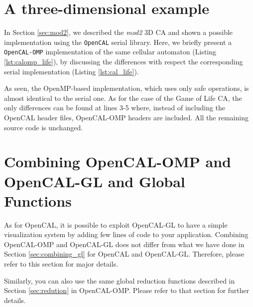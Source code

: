 \section{A three-dimensional example}
In Section \ref{sec:mod2}, we described the \emph{mod2} 3D CA and
shown a possible implementation using the \verb'OpenCAL' serial
library. Here, we briefly present a \verb'OpenCAL-OMP' implementation
of the same cellular automaton (Listing \ref{lst:calomp_life}), by
discussing the differences with respect the corresponding serial
implementation (Listing \ref{lst:cal_life}).



As seen, the OpenMP-based implementation, which uses only safe
operations, is almost identical to the serial one. As for the case of
the Game of Life CA, the only differences can be found at lines 3-5
where, instead of including the OpenCAL header files, 
OpenCAL-OMP headers are included. All the remaining source code is unchanged.

\section{Combining OpenCAL-OMP and OpenCAL-GL and Global Functions}

As for OpenCAL, it is possible to exploit OpenCAL-GL to have a simple
visualization system by adding few lines of code to your
application. Combining OpenCAL-OMP and OpenCAL-GL does not differ from
what we have done in Section \ref{sec:combining_gl} for OpenCAL and
OpenCAL-GL. Therefore, please refer to this section for major details.

Similarly, you can also use the same global reduction functions
described in Section \ref{sec:redution} in OpenCAL-OMP. Please refer to
that section for further details.
